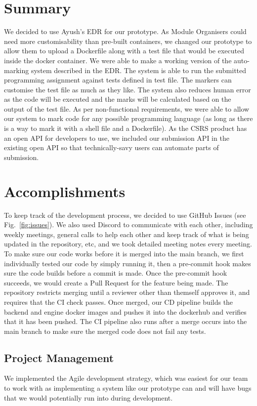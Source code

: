 \documentclass[a4paper, 12pt]{article}
\begin{document}
\section*{Summary}
We decided to use Ayush's EDR for our prototype. As Module Organisers could need more customisability than pre-built containers, we changed our prototype to allow them to upload a Dockerfile along with a test file that would be executed inside the docker container. We were able to make a working version of the auto-marking system described in the EDR. The system is able to run the submitted programming assignment against tests defined in test file. The markers can customise the test file as much as they like. The system also reduces human error as the code will be executed and the marks will be calculated based on the output of the test file. As per non-functional requirements, we were able to allow our system to mark code for any possible programming language (as long as there is a way to mark it with a shell file and a Dockerfile). As the CSRS product has an open API for developers to use, we included our submission API in the existing open API so that technically-savy users can automate parts of submission.

\section*{Accomplishments}
To keep track of the development process, we decided to use GitHub Issues (see Fig.~\ref{fig:issues}). We also used Discord to communicate with each other, including weekly meetings, general calls to help each other and keep track of what is being updated in the repository, etc, and we took detailed meeting notes every meeting. To make sure our code works before it is merged into the main branch, we first individually tested our code by simply running it, then a pre-commit hook makes sure the code builds before a commit is made. Once the pre-commit hook succeeds, we would create a Pull Request for the feature being made. The repository restricts merging until a reviewer other than themself approves it, and requires that the CI check passes. Once merged, our CD pipeline builds the backend and engine docker images and pushes it into the dockerhub and verifies that it has been pushed. The CI pipeline also runs after a merge occurs into the main branch to make sure the merged code does not fail any tests.

\subsection*{Project Management}
We implemented the Agile development strategy, which was easiest for our team to work with as implementing a system like our prototype can and will have bugs that we would potentially run into during development.
\end{document}
